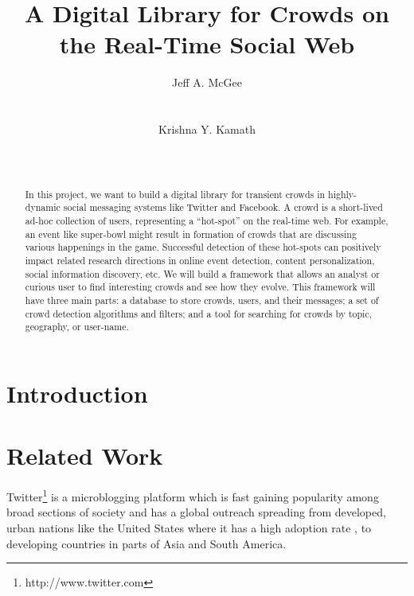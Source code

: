 \documentclass{sig-alternate}
\begin{document}
\title{A Digital Library for Crowds on the Real-Time Social Web}

\author{
\alignauthor Jeff A. McGee\\
       \\
       \\
\alignauthor Krishna Y. Kamath\\
      \\
       \\
}

\maketitle

\begin{abstract}
In this project, we want to build a digital library for transient crowds in highly-dynamic social messaging systems like Twitter and Facebook. A crowd is a short-lived ad-hoc collection of users, representing a ``hot-spot'' on the real-time web.  For example, an event like super-bowl might result in formation of crowds that are discussing various happenings in the game. Successful detection of these hot-spots can positively impact related research directions in online event detection, content personalization, social information discovery, etc. We will build a framework that allows an analyst or curious user to find interesting crowds and see how they evolve.  This framework will have three main parts: a database to store crowds, users, and their messages; a set of crowd detection algorithms and filters; and a tool for searching for crowds by topic, geography, or user-name.
\end{abstract}

\section{Introduction}

\section{Related Work}
Twitter\footnote{http://www.twitter.com} is a microblogging platform which is
fast gaining popularity\cite{Oreilly:2009} among broad sections of society and
has a global outreach spreading from developed, urban nations like the United
States where it has a high adoption rate \cite{Java:2007}, to developing
countries in parts of Asia and South America.
\end{document}
